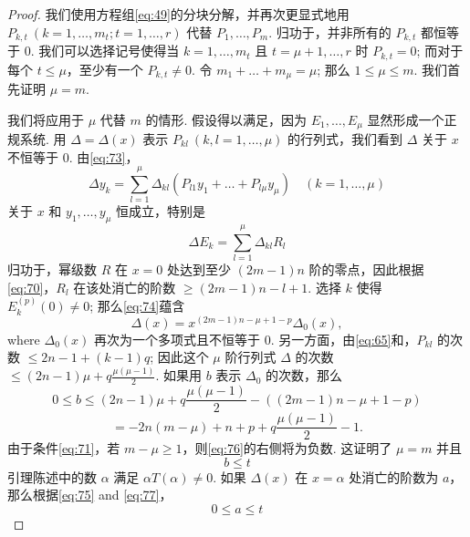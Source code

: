 \begin{proof}
我们使用方程组\eqref{eq:49}的分块分解，并再次更显式地用 $P_{k,t} \ (k=1, \dots, m_t; t= 1, \dots, r)$ 代替 $P_1, \dots, P_m$. 归功于，并非所有的 $P_{k,t}$ 都恒等于 0. 我们可以选择记号使得当 $k=1, \dots, m_t$ 且 $t=\mu+1, \dots, r$ 时 $P_{k,t} = 0$; 而对于每个 $t \le \mu$，至少有一个 $P_{k,t} \neq 0$. 令 $m_1 + \dots + m_\mu = \mu$; 那么 $1 \le \mu \le m$. 我们首先证明 $\mu = m$.

我们将应用于 $\mu$ 代替 $m$ 的情形. 假设得以满足，因为 $E_1, \dots, E_\mu$ 显然形成一个正规系统. 用 $\Delta = \Delta(x)$ 表示 $P_{kl} \ (k, l = 1, \dots, \mu)$ 的行列式，我们看到 $\Delta$ 关于 $x$ 不恒等于 0. 由\eqref{eq:73}，
\begin{equation}
\Delta y_k = \sum_{l=1}^{\mu} \Delta_{kl} (P_{l1}y_1 + \dots + P_{l\mu} y_{\mu}) \quad (k=1,\dots,\mu) \tag{73}\label{eq:73}
\end{equation}
关于 $x$ 和 $y_1, \dots, y_\mu$ 恒成立，特别是
\begin{equation}
\Delta E_{k} = \sum_{l=1}^{\mu} \Delta_{kl} R_{l} \tag{74}\label{eq:74}
\end{equation}
归功于，幂级数 $R$ 在 $x=0$ 处达到至少 $(2m-1)n$ 阶的零点，因此根据\eqref{eq:70}，$R_l$ 在该处消亡的阶数 $\ge (2m-1)n - l + 1$. 选择 $k$ 使得 $E_k^{(p)}(0) \neq 0$; 那么\eqref{eq:74}蕴含
\begin{equation}
\Delta(x) = x^{(2m-1)n - \mu + 1 - p} \Delta_0(x), \tag{75}\label{eq:75}
\end{equation}
where $\Delta_0(x)$ 再次为一个多项式且不恒等于 0. 另一方面，由\eqref{eq:65}和，$P_{kl}$ 的次数 $\le 2n - 1 + (k-1)q$; 因此这个 $\mu$ 阶行列式 $\Delta$ 的次数 $\le (2n-1)\mu + q \frac{\mu(\mu-1)}{2}$. 如果用 $b$ 表示 $\Delta_0$ 的次数，那么
\begin{equation}
0 \le b \le (2n-1)\mu + q\frac{\mu(\mu-1)}{2} - \left((2m-1)n - \mu + 1 - p\right) \tag{76}\label{eq:76}
\end{equation}
\[= -2n(m-\mu) + n + p + q\frac{\mu(\mu-1)}{2} - 1.\]
由于条件\eqref{eq:71}，若 $m - \mu \ge 1$，则\eqref{eq:76}的右侧将为负数. 这证明了 $\mu = m$ 并且
\begin{equation}
b \le t \tag{77}\label{eq:77}
\end{equation}
引理陈述中的数 $\alpha$ 满足 $\alpha T(\alpha) \neq 0$. 如果 $\Delta(x)$ 在 $x=\alpha$ 处消亡的阶数为 $a$，那么根据\eqref{eq:75} and \eqref{eq:77}，
\begin{equation}
0 \le a \le t \tag{78}\label{eq:78}
\end{equation}

\end{proof}
